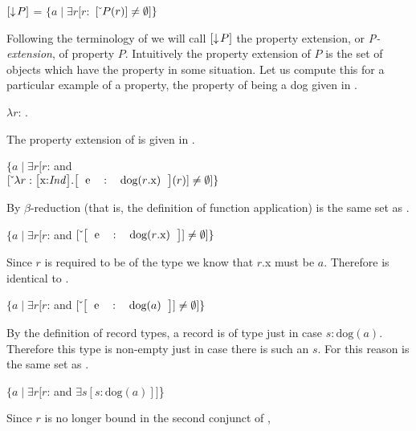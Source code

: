 \begin{ex} 
$[\downarrow\!P]$ = $\{a\mid\exists r[r:$
 $[\ \!\check{}\ \!P(r)]\not=\emptyset]\}$ 
\label{ex:propext}
\end{ex} 
Following the terminology of \cite{Cooper2011,Cooper2013} we will call
$[\downarrow\!P]$ the property extension, or \textit{P-extension}, of
property $P$. Intuitively the property extension of $P$ is the set of
objects which have the property in some situation.  Let us compute
this for a particular example of a property, the property of being a
dog given in \nexteg{}. 
\begin{ex} 
$\lambda r$: .  
\end{ex}
The property extension of \preveg{} is given in \nexteg{}.
\begin{ex} 
$\{a\mid\exists
  r[r$: and \\
\hspace*{2em}$\down{\lambda
  r:\text{\smallrecord{\smalltfield{x}{\textit{Ind}}}}
  . \text{\record{\tfield{e}{dog($r$.x)}}}(r)} \not=\emptyset]\}$ 
\end{ex} 
By $\beta$-reduction (that is, the definition of function application) \preveg{} is the same set as \nexteg{}.
\begin{ex} 
$\{a\mid\exists
  r[r$: and 
$\down{\text{\record{\tfield{e}{dog($r$.x)}}}} \not=\emptyset]\}$  
\end{ex} 
Since $r$ is required to be of the type
 we know that $r$.x
must be $a$.  Therefore \preveg{} is identical to \nexteg{}.
\begin{ex} 
$\{a\mid\exists
  r[r$: and 
$\down{\text{\record{\tfield{e}{dog($a$)}}}} \not=\emptyset]\}$ 
\end{ex} 
By the definition of record types, a record
 is of type
 just in case $s:\text{dog}(a)$.
Therefore this type is non-empty just in case there is such an $s$.
For this reason \preveg{} is the same set as \nexteg{}.
\begin{ex} 
$\{a\mid\exists
  r[r$: and 
$\exists s [s:\text{dog}(a)]]$\} 
\end{ex}
Since $r$ is no longer bound in the second conjunct of \preveg{},

